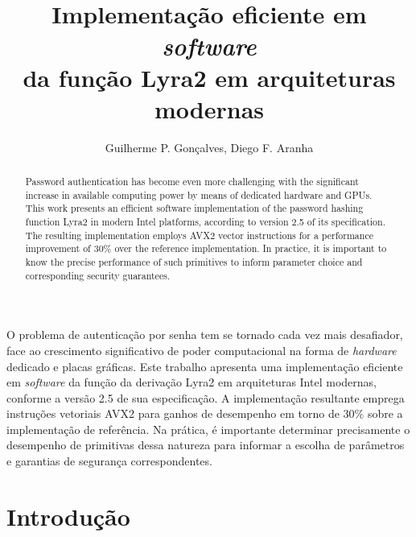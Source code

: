 \documentclass{article}
\begin{document}
\title{Implementação eficiente em \emph{software}\\ da função Lyra2 em arquiteturas modernas}

\author{Guilherme P. Gonçalves, Diego F. Aranha}

\address{Laboratório de Segurança e Criptografia (LASCA)\\
	Instituto de Computação (IC) -- Universidade Estadual de Campinas (Unicamp)\\
	Av. Albert Einsten, 1251 -- Campinas -- SP -- Brasil
}

\maketitle

\begin{abstract}
Password authentication has become even more challenging with the significant increase
in available computing power by means of dedicated hardware and GPUs. This work
presents an efficient software implementation of the password hashing function Lyra2 in modern Intel platforms,
according to version 2.5 of its specification. The resulting implementation employs
AVX2 vector instructions for a performance improvement of 30\% over the reference
implementation. In practice, it is important to know the precise performance of such primitives to inform
parameter choice and corresponding security guarantees.
\end{abstract}

\begin{resumo}
O problema de autenticação por senha tem se tornado cada vez mais desafiador, face ao crescimento
significativo de poder computacional na forma de \emph{hardware} dedicado e placas gráficas.
Este trabalho apresenta uma implementação eficiente em \emph{software} da função da derivação Lyra2 em arquiteturas Intel modernas,
conforme a versão 2.5 de sua especificação. A implementação resultante emprega instruções vetoriais AVX2
para ganhos de desempenho em torno de 30\% sobre a implementação de referência. Na prática, é importante
determinar precisamente o desempenho de primitivas dessa natureza para informar a escolha de parâmetros
e garantias de segurança correspondentes.
\end{resumo}

\section{Introdução}
\end{document}
